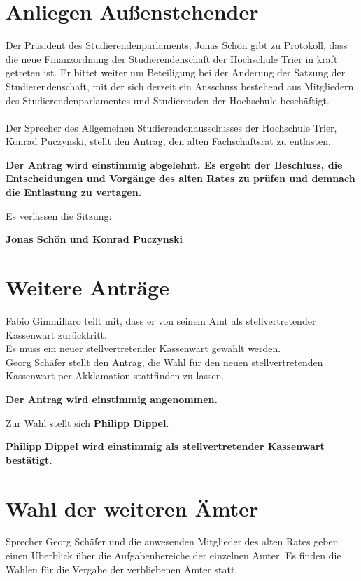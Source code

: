 \documentclass[a4paper, 11pt]{article} %
\begin{document}
\section{Anliegen Außenstehender}
Der Präsident des Studierendenparlaments, Jonas Schön gibt zu Protokoll, dass die neue Finanzordnung der Studierendenschaft der Hochschule Trier in kraft getreten ist. Er bittet weiter um Beteiligung bei der Änderung der Satzung der Studierendenschaft, mit der sich derzeit ein Ausschuss bestehend aus Mitgliedern des Studierendenparlamentes und Studierenden der Hochschule beschäftigt.\\\\
Der Sprecher des Allgemeinen Studierendenausschusses der Hochschule Trier, Konrad Puczynski, stellt den Antrag, den alten Fachschaftsrat zu entlasten.
\begin{center}
	\textbf{Der Antrag wird einstimmig abgelehnt. Es ergeht der Beschluss, die Entscheidungen und Vorgänge des alten Rates zu prüfen und demnach die Entlastung zu vertagen.}
\end{center}
Es verlassen die Sitzung:
\begin{flushleft}
	\textbf{Jonas Schön und Konrad Puczynski}
\end{flushleft}

\section{Weitere Anträge}
Fabio Gimmillaro teilt mit, dass er von seinem Amt als stellvertretender Kassenwart zurücktritt.\\
Es muss ein neuer stellvertretender Kassenwart gewählt werden.\\ 
Georg Schäfer stellt den Antrag, die Wahl für den neuen stellvertretenden Kassenwart per Akklamation stattfinden zu lassen.
\begin{center}
	\textbf{Der Antrag wird einstimmig angenommen.}
\end{center}
Zur Wahl stellt sich \textbf{Philipp Dippel}.\\
\begin{center}
	\textbf{Philipp Dippel wird einstimmig als stellvertretender Kassenwart bestätigt.}
\end{center}

\section{Wahl der weiteren Ämter}
Sprecher Georg Schäfer und die anwesenden Mitglieder des alten Rates geben einen Überblick über die Aufgabenbereiche der einzelnen Ämter.
Es finden die Wahlen für die Vergabe der verbliebenen Ämter statt.
\end{document}
